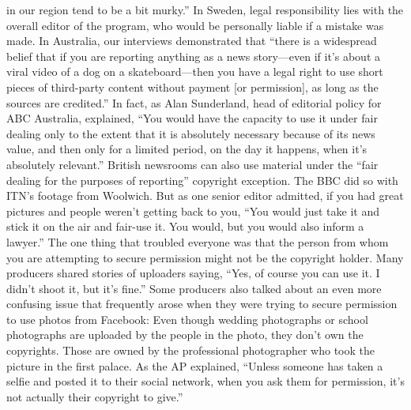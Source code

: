 \begin{enumerate}
in our region tend to be a bit murky.'' In Sweden, legal responsibility lies
with the overall editor of the program, who would be personally liable if a
mistake was made.
In Australia, our interviews demonstrated that ``there is a widespread belief
that if you are reporting anything as a news story—even if it's about a viral
video of a dog on a skateboard—then you have a legal right to use short
pieces of third-party content without payment [or permission], as long as
the sources are credited.'' In fact, as Alan Sunderland, head of editorial policy
for ABC Australia, explained, ``You would have the capacity to use it
under fair dealing only to the extent that it is absolutely necessary because
of its news value, and then only for a limited period, on the day it happens,
when it's absolutely relevant.''
British newsrooms can also use material under the ``fair dealing for the purposes
of reporting'' copyright exception. The BBC did so with ITN's footage
from Woolwich. But as one senior editor admitted, if you had great pictures
and people weren't getting back to you, ``You would just take it and stick it
on the air and fair-use it. You would, but you would also inform a lawyer.''
The one thing that troubled everyone was that the person from whom you
are attempting to secure permission might not be the copyright holder.
Many producers shared stories of uploaders saying, ``Yes, of course you
can use it. I didn't shoot it, but it's fine.'' Some producers also talked about
an even more confusing issue that frequently arose when they were trying
to secure permission to use photos from Facebook: Even though wedding
photographs or school photographs are uploaded by the people in the
photo, they don't own the copyrights. Those are owned by the professional
photographer who took the picture in the first palace. As the AP explained,
``Unless someone has taken a selfie and posted it to their social network,
when you ask them for permission, it's not actually their copyright to give.''


\end{enumerate}
